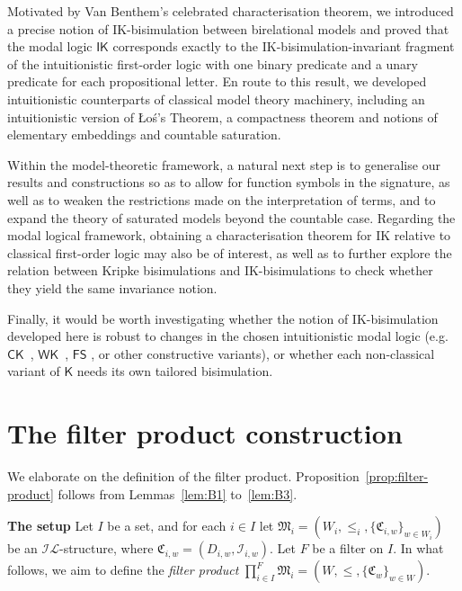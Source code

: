 \documentclass[submission,copyright,creativecommons]{eptcs}
\newcommand{\mo}{\mathfrak}
\newcommand{\II}{\mathscr{I}}
\newcommand{\IL}{\mathscr{I\!\!L}}   %
\newcommand{\IK}{\mathsf{IK}}
\begin{document}
Motivated by Van Benthem's celebrated characterisation theorem, we introduced a precise notion of IK-bi\-si\-mu\-la\-tion between birelational models and proved that the modal logic $\IK$ corresponds exactly to the IK-bi\-si\-mu\-la\-tion-invariant fragment of the intuitionistic first-order logic with one binary predicate and a unary predicate for each propositional letter.
En route to this result, we developed intuitionistic counterparts of classical model theory machinery, including an intuitionistic version of \L{}o{\'s}'s Theorem, a compactness theorem and notions of elementary embeddings and countable saturation.

Within the model-theoretic framework, a natural next step is to generalise our results and constructions so as to allow for function symbols in the signature, as well as to weaken the restrictions made on the interpretation of terms, and to expand the theory of saturated models beyond the countable case. Regarding the modal logical framework, obtaining a characterisation theorem for IK relative to classical first-order logic may also be of interest, as well as to further explore the relation between Kripke bisimulations and IK-bi\-si\-mu\-la\-tions to check whether they yield the same invariance notion.

Finally, it would be worth investigating whether the notion of IK-bisimulation developed here is robust to changes in the chosen intuitionistic modal logic (e.g.~$\mathsf{CK}$~\cite{BelPaiRit01,Pai03,MenPai05}, $\mathsf{WK}$~\cite{Wij90,WijNer05}, $\mathsf{FS}$ \cite{WolterZakharyaschev1999}, or other constructive variants), or whether each non-classical variant of $\mathsf{K}$ needs its own tailored bisimulation.




\appendix
\section{The filter product construction}\label{app:filter-product}

  We elaborate on the definition of the filter product.
  Proposition~\ref{prop:filter-product} follows from Lemmas~\ref{lem:B1} to~\ref{lem:B3}.

  \bigskip\noindent
  \textbf{The setup}
  Let $I$ be a set, and for each $i \in I$ let
  $\mo{M}_i = (W_i, \leq_i, \{ \mo{C}_{i,w} \}_{w \in W_i})$ be an $\IL$-structure,
  where $\mo{C}_{i, w} = (D_{i, w}, \II_{i, w})$.
  Let $F$ be a filter on $I$.
  In what follows, we aim to define the \emph{filter product}
  $\prod_{i \in I}^F \mo{M}_i = (W, {\leq,} \{ \mo{C}_w \}_{w \in W})$.
\end{document}
